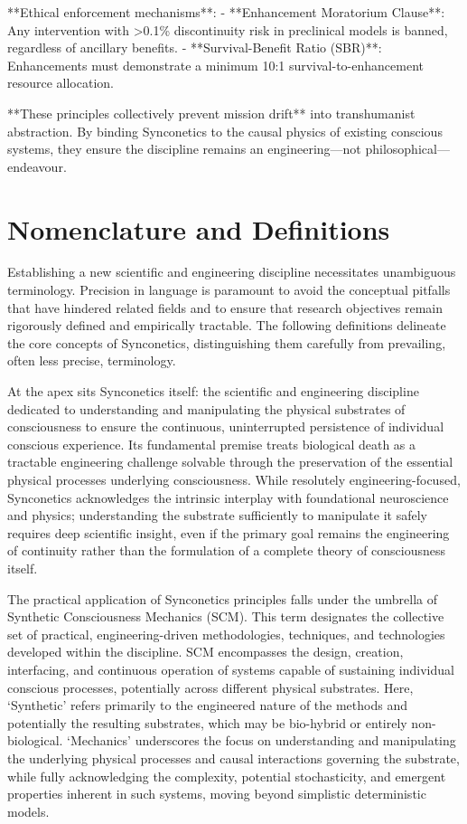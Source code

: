 \documentclass[10pt]{article}
\begin{document}
\begin{sloppypar}
  **Ethical enforcement mechanisms**:
  - **Enhancement Moratorium Clause**: Any intervention with >0.1\% discontinuity risk in preclinical models is banned, regardless of ancillary benefits.
  - **Survival-Benefit Ratio (SBR)**: Enhancements must demonstrate a minimum 10:1 survival-to-enhancement resource allocation.

  **These principles collectively prevent mission drift** into transhumanist abstraction. By binding Synconetics to the causal physics of existing conscious systems, they ensure the discipline remains an engineering—not philosophical—endeavour.
  \section{Nomenclature and Definitions}
  \label{sec:nomenclature}

  Establishing a new scientific and engineering discipline necessitates unambiguous terminology. Precision in language is paramount to avoid the conceptual pitfalls that have hindered related fields and to ensure that research objectives remain rigorously defined and empirically tractable. The following definitions delineate the core concepts of Synconetics, distinguishing them carefully from prevailing, often less precise, terminology.

  At the apex sits Synconetics itself: the scientific and engineering discipline dedicated to understanding and manipulating the physical substrates of consciousness to ensure the continuous, uninterrupted persistence of individual conscious experience. Its fundamental premise treats biological death as a tractable engineering challenge solvable through the preservation of the essential physical processes underlying consciousness. While resolutely engineering-focused, Synconetics acknowledges the intrinsic interplay with foundational neuroscience and physics; understanding the substrate sufficiently to manipulate it safely requires deep scientific insight, even if the primary goal remains the engineering of continuity rather than the formulation of a complete theory of consciousness itself.

  The practical application of Synconetics principles falls under the umbrella of Synthetic Consciousness Mechanics (SCM). This term designates the collective set of practical, engineering-driven methodologies, techniques, and technologies developed within the discipline. SCM encompasses the design, creation, interfacing, and continuous operation of systems capable of sustaining individual conscious processes, potentially across different physical substrates. Here, ‘Synthetic’ refers primarily to the engineered nature of the methods and potentially the resulting substrates, which may be bio-hybrid or entirely non-biological. ‘Mechanics’ underscores the focus on understanding and manipulating the underlying physical processes and causal interactions governing the substrate, while fully acknowledging the complexity, potential stochasticity, and emergent properties inherent in such systems, moving beyond simplistic deterministic models.


\end{sloppypar}
\end{document}
